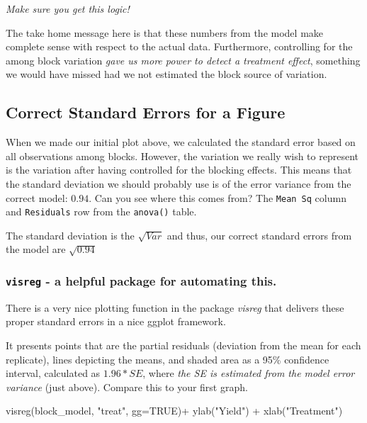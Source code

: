 \documentclass[
]{book}
\newenvironment{Shaded}{\begin{snugshade}}{\end{snugshade}}
\newcommand{\AttributeTok}[1]{\textcolor[rgb]{0.77,0.63,0.00}{#1}}
\newcommand{\ConstantTok}[1]{\textcolor[rgb]{0.00,0.00,0.00}{#1}}
\newcommand{\FunctionTok}[1]{\textcolor[rgb]{0.00,0.00,0.00}{#1}}
\newcommand{\NormalTok}[1]{#1}
\newcommand{\SpecialCharTok}[1]{\textcolor[rgb]{0.00,0.00,0.00}{#1}}
\newcommand{\StringTok}[1]{\textcolor[rgb]{0.31,0.60,0.02}{#1}}
\begin{document}
\emph{Make sure you get this logic!}

The take home message here is that these numbers from the model make complete sense with respect to the actual data. Furthermore, controlling for the among block variation \emph{gave us more power to detect a treatment effect}, something we would have missed had we not estimated the block source of variation.

\hypertarget{correct-standard-errors-for-a-figure}{%
\subsection{Correct Standard Errors for a Figure}\label{correct-standard-errors-for-a-figure}}

When we made our initial plot above, we calculated the standard error based on all observations among blocks. However, the variation we really wish to represent is the variation after having controlled for the blocking effects. This means that the standard deviation we should probably use is of the error variance from the correct model: \(0.94\). Can you see where this comes from? The \texttt{Mean\ Sq} column and \texttt{Residuals} row from the \texttt{anova()} table.

The standard deviation is the \(\sqrt{Var}\) and thus, our correct standard errors from the model are \(\sqrt{0.94}\)

\hypertarget{visreg---a-helpful-package-for-automating-this.}{%
\subsubsection{\texorpdfstring{\texttt{visreg} - a helpful package for automating this.}{visreg - a helpful package for automating this.}}\label{visreg---a-helpful-package-for-automating-this.}}

There is a very nice plotting function in the package \emph{visreg} that delivers these proper standard errors in a nice ggplot framework.

It presents points that are the partial residuals (deviation from the mean for each replicate), lines depicting the means, and shaded area as a 95\% confidence interval, calculated as \(1.96*SE\), where \emph{the SE is estimated from the model error variance} (just above). Compare this to your first graph.

\begin{Shaded}
\begin{Highlighting}[]
\FunctionTok{visreg}\NormalTok{(block\_model, }\StringTok{"treat"}\NormalTok{, }\AttributeTok{gg=}\ConstantTok{TRUE}\NormalTok{)}\SpecialCharTok{+}
  \FunctionTok{ylab}\NormalTok{(}\StringTok{"Yield"}\NormalTok{) }\SpecialCharTok{+} 
  \FunctionTok{xlab}\NormalTok{(}\StringTok{"Treatment"}\NormalTok{) }
\end{Highlighting}
\end{Shaded}
\end{document}
